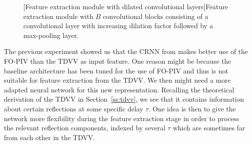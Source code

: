 \begin{figure}[t]
    \centering
    \hspace{1cm}
    
    [Feature extraction module with dilated convolutional layers]{Feature extraction module with $B$ convolutional blocks consisting of a convolutional layer with increasing dilation factor followed by a max-pooling layer.}
    \label{fig:TDVVdilatedConv}
\end{figure}

The previous experiment showed us that the CRNN from \cite{perotin_crnn-based_2018} makes better use of the FO-PIV than the TDVV as input feature. One reason might be because the baseline architecture has been tuned for the use of FO-PIV and thus is not suitable for feature extraction from the TDVV. We then might need a more adapted neural network for this new representation. Recalling the theoretical derivation of the TDVV in Section~\ref{ss:tdvv}, we see that it contains information about certain reflections at some specific delay $\tau$. One idea is then to give the network more flexibility during the feature extraction stage in order to process the relevant reflection components, indexed by several $\tau$ which are sometimes far from each other in the TDVV.

